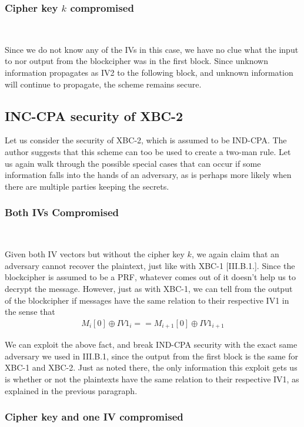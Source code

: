 \documentclass[conference]{IEEEtran}
\begin{document}
\subsubsection{Cipher key $k$ compromised} \

Since we do not know any of the IVs in this case, we have no clue what the input to nor output from the blockcipher was in the first block. Since unknown information propagates as IV2 to the following block, and unknown information will continue to propagate, the scheme remains secure.

\subsection{INC-CPA security of XBC-2}

Let us consider the security of XBC-2, which is assumed to be IND-CPA. The author suggests that this scheme can too be used to create a two-man rule. Let us again walk through the possible special cases that can occur if some information falls into the hands of an adversary, as is perhaps more likely when there are multiple parties keeping the secrets.

\subsubsection{Both IVs Compromised} \

Given both IV vectors but without the cipher key $k$, we again claim that an adversary cannot recover the plaintext, just like with XBC-1 [III.B.1.]. Since the blockcipher is assumed to be a PRF, whatever comes out of it doesn't help us to decrypt the message. However, just as with XBC-1, we can tell from the output of the blockcipher if messages have the same relation to their respective IV1 in the sense that
\begin{gather*}
  M_i[0] \oplus IV1_i == M_{i+1}[0] \oplus IV1_{i+1}
\end{gather*}

We can exploit the above fact, and break IND-CPA security with the exact same adversary we used in III.B.1, since the output from the first block is the same for XBC-1 and XBC-2. Just as noted there, the only information this exploit gets us is whether or not the plaintexts have the same relation to their respective IV1, as explained in the previous paragraph.

\subsubsection{Cipher key and one IV compromised} \
\end{document}
